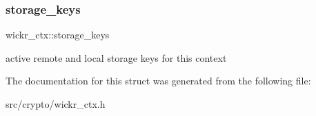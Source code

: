 \subsubsection{\texorpdfstring{storage\+\_\+keys}{storage\_keys}}
{\footnotesize\ttfamily wickr\+\_\+ctx\+::storage\+\_\+keys}

active remote and local storage keys for this context 

The documentation for this struct was generated from the following file\+:\begin{DoxyCompactItemize}
\item 
src/crypto/wickr\+\_\+ctx.\+h\end{DoxyCompactItemize}
